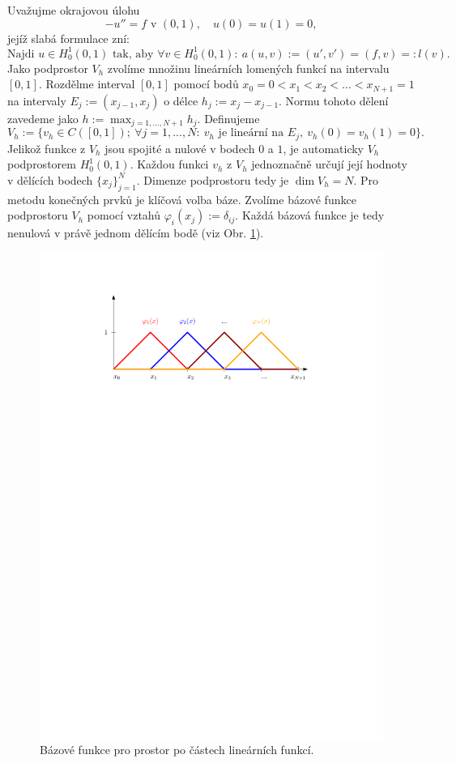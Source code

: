 Uvažujme okrajovou úlohu
\[ -u''=f \mbox{ v }(0,1),\quad u(0)=u(1)=0, \]
jejíž slabá formulace zní:
\[ \mbox{Najdi }u\in H^1_0(0,1) \mbox{ tak, aby }\forall v\in H^1_0(0,1):~a(u,v):=(u',v')=(f,v)=:l(v). \]
Jako podprostor $V_h$ zvolíme množinu lineárních lomených funkcí na intervalu $[0,1]$.
Rozdělme interval $[0,1]$ pomocí bodů $x_0=0<x_1<x_2<...<x_{N+1}=1$ na intervaly $E_j:=(x_{j-1},x_j)$ o délce $h_j:=x_j-x_{j-1}$.
Normu tohoto dělení zavedeme jako $h:=\max_{j=1,...,N+1} h_j$.
Definujeme
\[ V_h:=\{v_h\in C([0,1]);~\forall j=1,...,N:~v_h \mbox{ je lineární na }E_j,~v_h(0)=v_h(1)=0 \}. \]
Jelikož funkce z $V_h$ jsou spojité a nulové v bodech $0$ a $1$, je automaticky $V_h$ podprostorem $H^1_0(0,1)$.
Každou funkci $v_h$ z $V_h$ jednoznačně určují její hodnoty v dělících bodech $\{x_j\}_{j=1}^N$.
Dimenze podprostoru tedy je $\dim V_h=N$.
Pro metodu konečných prvků je klíčová volba báze.
Zvolíme bázové funkce podprostoru $V_h$ pomocí vztahů $\varphi_i(x_j):=\delta_{ij}$.
Každá bázová funkce je tedy nenulová v právě jednom dělícím bodě (viz Obr. \ref{fig:base_1d_lin}).
\begin{figure}[h]
\centering
\includegraphics{base_1d_lin}
\caption{Bázové funkce pro prostor po částech lineárních funkcí.}
\label{fig:base_1d_lin}
\end{figure}
